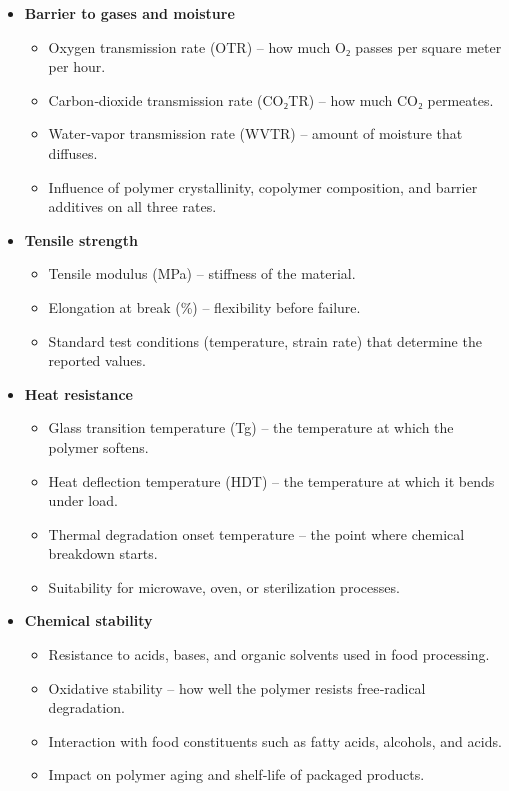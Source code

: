 \begin{itemize}
\item 
\textbf{Barrier to gases and moisture}
  \begin{itemize}
\item Oxygen transmission rate (OTR) – how much O₂ passes per square meter per hour.
\item Carbon‑dioxide transmission rate (CO₂TR) – how much CO₂ permeates.
\item Water‑vapor transmission rate (WVTR) – amount of moisture that diffuses.
\item Influence of polymer crystallinity, copolymer composition, and barrier additives on all three rates.
  \end{itemize}
\item 
\textbf{Tensile strength}
  \begin{itemize}
\item Tensile modulus (MPa) – stiffness of the material.
\item Elongation at break (\%) – flexibility before failure.
\item Standard test conditions (temperature, strain rate) that determine the reported values.
  \end{itemize}
\item 
\textbf{Heat resistance}
  \begin{itemize}
\item Glass transition temperature (Tg) – the temperature at which the polymer softens.
\item Heat deflection temperature (HDT) – the temperature at which it bends under load.
\item Thermal degradation onset temperature – the point where chemical breakdown starts.
\item Suitability for microwave, oven, or sterilization processes.
  \end{itemize}
\item 
\textbf{Chemical stability}
  \begin{itemize}
\item Resistance to acids, bases, and organic solvents used in food processing.
\item Oxidative stability – how well the polymer resists free‑radical degradation.
\item Interaction with food constituents such as fatty acids, alcohols, and acids.
\item Impact on polymer aging and shelf‑life of packaged products.
  \end{itemize}

\end{itemize}

